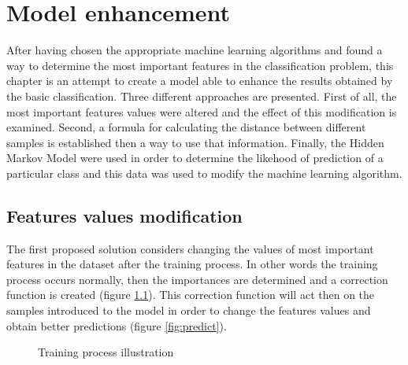 \chapter{Model enhancement}
After having chosen the appropriate machine learning algorithms and found a way to determine the most important features in the classification problem, this chapter is an attempt to create a model able to enhance the results obtained by the basic classification. Three different approaches are presented. First of all, the most important features values were altered and the effect of this modification is examined. Second, a formula for calculating the distance between different samples is established then a way to use that information. Finally, the Hidden Markov Model were used in order to determine the likehood of prediction of a particular class and this data was used to modify the machine learning algorithm. 

\section{Features values modification}
The first proposed solution considers changing the values of most important features in the dataset after the training process. In other words the training process occurs normally, then the importances are determined and a correction function is created (figure \ref{fig:train}). This correction function will act then on the samples introduced to the model in order to change the features values and obtain better predictions (figure \ref{fig:predict}). 

\begin{figure}[H]
    \centering
    \caption{Training process illustration} \label{fig:train}
\end{figure}

